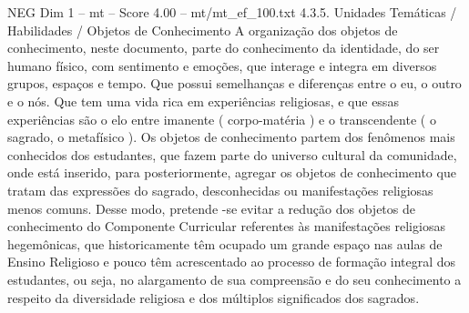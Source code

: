 \begin{textsample}{NEG Dim 1 – mt – Score 4.00 – mt/mt\_ef\_100.txt}  \label{ex:f1_neg_218}
4.3.5.
Unidades Temáticas / Habilidades / Objetos de Conhecimento A organização dos objetos de conhecimento, neste documento, parte do conhecimento da identidade, do ser humano físico, com sentimento e emoções, que interage e integra em diversos grupos, espaços e tempo.
Que possui semelhanças e diferenças entre o eu, o outro e o nós.
Que tem uma vida rica em experiências religiosas, e que essas experiências são o elo entre imanente ( corpo-matéria ) e o transcendente ( o sagrado, o metafísico ).
Os objetos de conhecimento partem dos fenômenos mais conhecidos dos estudantes, que fazem parte do universo cultural da comunidade, onde está inserido, para posteriormente, agregar os objetos de conhecimento que tratam das expressões do sagrado, desconhecidas ou manifestações religiosas menos comuns.
Desse modo, pretende -se evitar a redução dos objetos de conhecimento do Componente Curricular referentes às manifestações religiosas hegemônicas, que historicamente têm ocupado um grande espaço nas aulas de Ensino Religioso e pouco têm acrescentado ao processo de formação integral dos estudantes, ou seja, no alargamento de sua compreensão e do seu conhecimento a respeito da diversidade religiosa e dos múltiplos significados dos sagrados.

\end{textsample}
